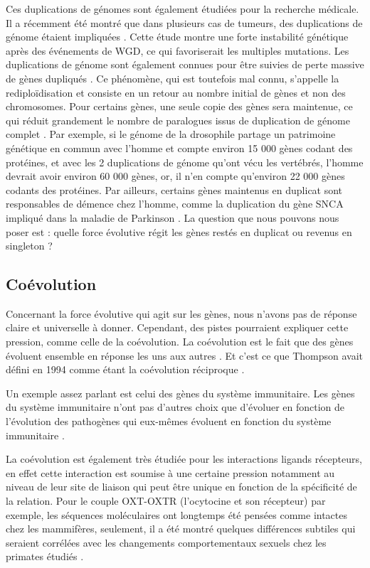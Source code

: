 \par Ces duplications de génomes sont également étudiées pour la recherche médicale. Il a récemment été montré que dans plusieurs cas de tumeurs, des duplications de génome étaient impliquées \parencite{gemble_genetic_2022}. Cette étude montre une forte instabilité génétique après des événements de WGD, ce qui favoriserait les multiples mutations. 
Les duplications de génome sont également connues pour être suivies de perte massive de gènes dupliqués \parencite{inoue_rapid_2015, jaillon_genome_2004}. Ce phénomène, qui est toutefois mal connu, s’appelle la rediploïdisation et consiste en un retour au nombre initial de gènes et non des chromosomes. Pour certains gènes, une seule copie des gènes sera maintenue, ce qui réduit grandement le nombre de paralogues issus de duplication de génome complet \parencite{byrne_yeast_2005}. Par exemple, si le génome de la drosophile partage un patrimoine génétique en commun avec l’homme et compte environ 15 000 gènes codant des protéines, et avec les 2 duplications de génome qu’ont vécu les vertébrés, l’homme devrait avoir environ 60 000 gènes, or, il n’en compte qu’environ 22 000 gènes codants des protéines. Par ailleurs, certains gènes maintenus en duplicat sont responsables de démence chez l’homme, comme la duplication du gène SNCA impliqué dans la maladie de Parkinson \parencite{chartier-harlin_alpha-synuclein_2004, ibanez_causal_2004}. 
La question que nous pouvons nous poser est : quelle force évolutive régit les gènes restés en duplicat ou revenus en singleton ? 

\subsection{Coévolution}\label{coevo}
\par Concernant la force évolutive qui agit sur les gènes, nous n’avons pas de réponse claire et universelle à donner. Cependant, des pistes pourraient expliquer cette pression, comme celle de la coévolution. La coévolution est le fait que des gènes évoluent ensemble en réponse les uns aux autres \parencite{lovell_integrated_2010}. Et c'est ce que Thompson avait défini en 1994 comme étant la coévolution réciproque \parencite{thompson_coevolutionary_1994}. 
\par Un exemple assez parlant est celui des gènes du système immunitaire. Les gènes du système immunitaire n’ont pas d’autres choix que d’évoluer en fonction de l’évolution des pathogènes qui eux-mêmes évoluent en fonction du système immunitaire \parencite{schlesinger_coevolutionary_2014}. 
\par La coévolution est également très étudiée pour les interactions ligands récepteurs, en effet cette interaction est soumise à une certaine pression notamment au niveau de leur site de liaison qui peut être unique en fonction de la spécificité de la relation. Pour le couple OXT-OXTR (l’ocytocine et son récepteur) par exemple, les séquences moléculaires ont longtemps été pensées comme intactes chez les mammifères, seulement, il a été montré quelques différences subtiles qui seraient corrélées avec les changements comportementaux sexuels chez les primates étudiés \parencite{vargas-pinilla_evolutionary_2015}.


